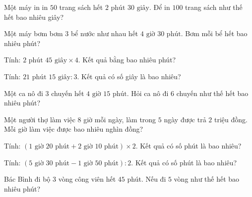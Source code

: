 \begin{ex}
  Một máy in in $50$ trang sách hết $2\text{ phút } 30\text{ giây}$. Để in $100$ trang sách như thế hết bao nhiêu giây?
\end{ex}

\begin{ex}
  Một máy bơm bơm $3$ bể nước như nhau hết $4\text{ giờ } 30\text{ phút}$. Bơm mỗi bể hết bao nhiêu phút?
\end{ex}

\begin{ex}
  Tính: $2\text{ phút } 45\text{ giây} \times 4$. Kết quả bằng bao nhiêu phút?
\end{ex}

\begin{ex}
  Tính: $21\text{ phút } 15\text{ giây} : 3$. Kết quả có số giây là bao nhiêu?
\end{ex}

\begin{ex}
  Một ca nô đi $3$ chuyến hết $4\text{ giờ } 15\text{ phút}$. Hỏi ca nô đi $6$ chuyến như thế hết bao nhiêu phút?
\end{ex}

\begin{ex}
  Một người thợ làm việc $8$ giờ mỗi ngày, làm trong $5$ ngày được trả $2$ triệu đồng. Mỗi giờ làm việc được bao nhiêu nghìn đồng?
\end{ex}

\begin{ex}
  Tính: $(1\text{ giờ } 20\text{ phút} + 2\text{ giờ } 10\text{ phút}) \times 2$. Kết quả có số phút là bao nhiêu?
\end{ex}

\begin{ex}
  Tính: $(5\text{ giờ } 30\text{ phút} - 1\text{ giờ } 50\text{ phút}) : 2$. Kết quả có số phút là bao nhiêu?
\end{ex}

\begin{ex}
  Bác Bình đi bộ $3$ vòng công viên hết $45$ phút. Nếu đi $5$ vòng như thế hết bao nhiêu phút?
\end{ex}

